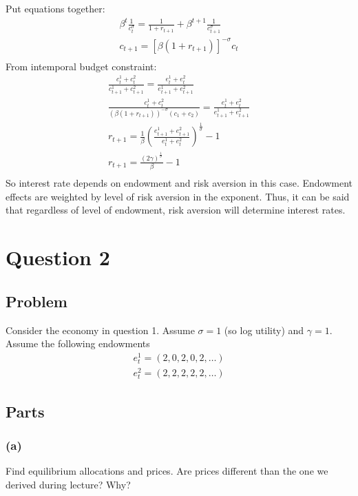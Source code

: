 \documentclass[10pt, a4paper]{article}
\begin{document}
      Put equations together:
      \begin{gather*}
        \beta^t\frac{1}{c_t^{\sigma}} = \frac{1}{1+r_{t+1}} + \beta^{t+1}\frac{1}{c_{t+1}^{\sigma}} \\
        c_{t+1} = [\beta(1+r_{t+1})]^{-\sigma} c_t \\
      \end{gather*}
      From intemporal budget constraint:
      \begin{gather*}
        \frac{c_t^1+c_t^2}{c_{t+1}^1+c_{t+1}^2} = \frac{e_t^1+e_t^2}{e_{t+1}^1+e_{t+1}^2} \\
        \frac{c_t^1+c_t^2}{(\beta(1+r_{t+1}))^{-\sigma}(c_1+c_2)} = \frac{e_t^1+e_t^2}{e_{t+1}^1+e_{t+1}^2} \\
        \boxed{r_{t+1} = \frac{1}{\beta}(\frac{e_{t+1}^1+e_{t+1}^2}{e_t^1+e_t^2})^{\frac{1}{\sigma}}-1} \\
        \boxed{r_{t+1} = \frac{(2\gamma)^{\frac{1}{\sigma}}}{\beta}-1} \\
      \end{gather*}
      So interest rate depends on endowment and risk aversion in this case. Endowment effects are weighted by level of risk aversion in the exponent. Thus, it can be said that regardless of level of endowment, risk aversion will determine interest rates.
        
\section*{Question 2}
  \subsection*{Problem}
    Consider the economy in question 1. Assume $\sigma = 1$ (so log utility) and $\gamma = 1$. Assume the following endowments
    \begin{gather*}
      e^1_t = (2,0,2,0,2,\ldots)\\
      e^2_t = (2,2,2,2,2,\ldots)
    \end{gather*}

  \subsection*{Parts}
    \subsubsection*{(a)}
      Find equilibrium allocations and prices. Are prices different than the one we derived during lecture? Why?
\end{document}

